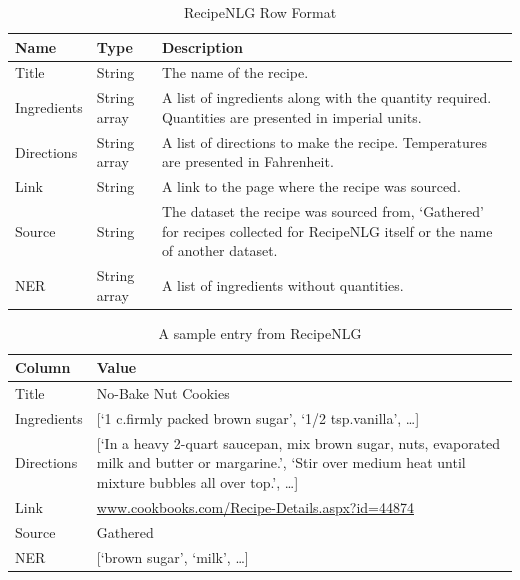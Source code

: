 \begin{table}[h]
    \caption{RecipeNLG Row Format}\label{tab:recipenlg_row_format}

    \begin{tabulary}{\textwidth}{llL}
        \toprule
        \textbf{Name} & \textbf{Type} & \textbf{Description} \\\midrule

        Title & String & The name of the recipe.\\

        Ingredients & String array & A list of ingredients along with the quantity required. Quantities are presented in imperial units.\\

        Directions & String array & A list of directions to make the recipe. Temperatures are presented in Fahrenheit.\\

        Link & String & A link to the page where the recipe was sourced.\\

        Source & String & The dataset the recipe was sourced from, \enquote*{Gathered} for recipes collected for RecipeNLG itself or the name of another dataset.\\

        NER & String array & A list of ingredients without quantities.\\
        \bottomrule
    \end{tabulary}
\end{table}

\begin{table}[h]
    \caption{\label{tab:sample_entry}A sample entry from RecipeNLG}
    \begin{tabulary}{\textwidth}{lL}
        \toprule
        \textbf{Column}&\textbf{Value}\\\midrule
            Title & No-Bake Nut Cookies\\
            Ingredients & [\enquote*{1 c.\@ firmly packed brown sugar}, \enquote*{1/2 tsp.\@ vanilla}, \ldots]\\
            Directions & [\enquote*{In a heavy 2-quart saucepan, mix brown sugar, nuts, evaporated milk and butter or margarine.},
            \enquote*{Stir over medium heat until mixture bubbles all over top.}, \ldots]\\
            Link & \href{www.cookbooks.com/Recipe-Details.aspx?id=44874}{www.cookbooks.com/Recipe-Details.aspx?id=44874}\\
            Source & Gathered\\
            NER & [\enquote*{brown sugar}, \enquote*{milk}, \ldots]\\
        \bottomrule
    \end{tabulary}
\end{table}

